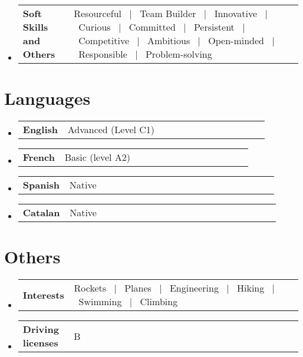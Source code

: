 \documentclass[a4paper,11pt,dvipsnames]{article}
\newcommand{\resumeSectionTypeOne}[2]{
	\item\begin{tabular*}{0.99\textwidth}[t]{
			p{0.18\linewidth}p{0.81\linewidth}
		}
		\textbf{#1} & #2
	\end{tabular*}\vspace{-2pt}
}
\newcommand{\resumeHeadingListStart}{
	\begin{itemize}[leftmargin=0.15in, label={}]
	}
\newcommand{\resumeHeadingListEnd}{\end{itemize}}
\begin{document}
	\resumeHeadingListStart{}
	\resumeSectionTypeOne{Soft Skills and Others}{Resourceful \ $|$ \ Team Builder \ $|$ \ Innovative \ $|$ \ Curious \ $|$ \ Committed \ $|$ \ Persistent \ $|$ \ Competitive \ $|$ \ Ambitious \ $|$ \ Open-minded \ $|$ \ Responsible \ $|$ \ Problem-solving}
	\resumeHeadingListEnd{}
	
	\section{Languages}
	\resumeHeadingListStart{}
	\resumeSectionTypeOne{English}{Advanced (Level C1)}
	\resumeSectionTypeOne{French}{Basic (level A2)}
	\resumeSectionTypeOne{Spanish}{Native}
	\resumeSectionTypeOne{Catalan}{Native}
	\resumeHeadingListEnd{}
	
	\section{Others}
	\resumeHeadingListStart{}
	\resumeSectionTypeOne{Interests}{Rockets \ $|$ \ Planes \ $|$ \ Engineering \ $|$ \ Hiking \ $|$ \ Swimming \ $|$ \ Climbing}
	\resumeHeadingListEnd{}
	
	\resumeHeadingListStart{}
	\resumeSectionTypeOne{Driving licenses}{B}
	\resumeHeadingListEnd{}
	
\end{document}
